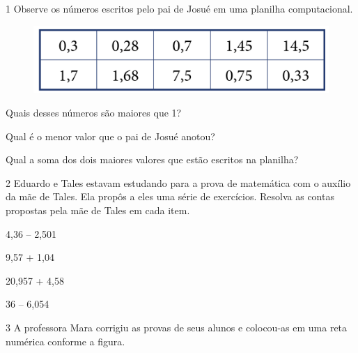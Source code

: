 \pagebreak
{}

\num{1} Observe os números escritos pelo pai de Josué em uma planilha computacional.

\begin{figure}[htpb!]
\centering
\includegraphics[width=.6\textwidth]{../ilustracoes/MAT5/SAEB_5ANO_MAT_figura86.png}
\end{figure}

\begin{escolha}
\item
  Quais desses números são maiores que 1?


\item
  Qual é o menor valor que o pai de Josué anotou?


\item
  Qual a soma dos dois maiores valores que estão escritos na planilha?

\end{escolha}


\num{2} Eduardo e Tales estavam estudando para a prova de matemática com o
auxílio da mãe de Tales. Ela propôs a eles uma série de exercícios.
Resolva as contas propostas pela mãe de Tales em cada item.

\begin{escolha}
\item
  4,36 – 2,501

\bigskip

\item
  9,57 + 1,04

\bigskip

\item
  20,957 + 4,58

\bigskip

\item
  36 – 6,054

\bigskip
\end{escolha}

\num{3} A professora Mara corrigiu as provas de seus alunos e colocou-as em
uma reta numérica conforme a figura.

